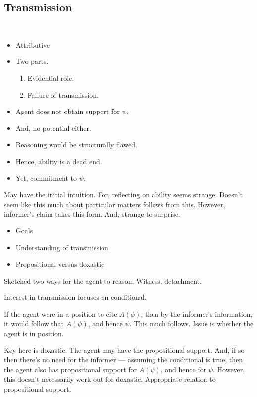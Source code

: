 \documentclass[10pt]{article}
\begin{document}
\subsection{Transmission}
\label{sec:transmission-overview}

\begin{note}[Goals]\mbox{ }

  \begin{itemize}
  \item Attributive
  \item Two parts.
    \begin{enumerate}
    \item Evidential role.
    \item Failure of transmission.
    \end{enumerate}
  \item Agent does not obtain support for \(\psi\).
  \item And, no potential either.
  \item Reasoning would be structurally flawed.
  \item Hence, ability is a dead end.
  \item Yet, commitment to \(\psi\).
  \end{itemize}

  May have the initial intuition.
  For, reflecting on ability seems strange.
  Doesn't seem like this much about particular matters follows from this.
  However, informer's claim takes this form.
  And, strange to surprise.

  \begin{itemize}
  \item Goals
  \item Understanding of transmission
  \item Propositional versus doxastic
  \end{itemize}
\end{note}

Sketched two ways for the agent to reason.
Witness, detachment.

Interest in transmission focuses on conditional.

If the agent were in a position to cite \(A(\phi)\), then by the informer's information, it would follow that \(A(\psi)\), and hence \(\psi\).
This much follows.
Issue is whether the agent is in position.

Key here is doxastic.
The agent may have the propositional support.
And, if so then there's no need for the informer --- assuming the conditional is true, then the agent also has propositional support for \(A(\psi)\), and hence for \(\psi\).
However, this doesn't necessarily work out for doxastic.
Appropriate relation to propositional support.
\end{document}
